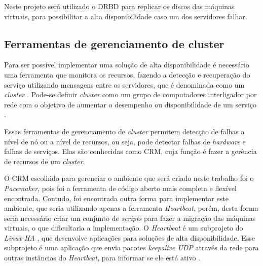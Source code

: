 Neste projeto será utilizado o \ac{DRBD} para replicar os discos das máquinas virtuais, para possibilitar a alta disponibilidade caso um 
dos servidores falhar.


\subsection{Ferramentas de gerenciamento de cluster}
\label{section:toolcluster}

Para ser possível implementar uma solução de alta disponibilidade é necessário uma ferramenta que monitora os recursos, fazendo a detecção e
recuperação do serviço utilizando mensagens entre os servidores, que é denominada como um \textit{cluster} \cite{perkov2011}. 
Pode-se definir \textit{cluster} como um grupo de computadores interligador por rede com o objetivo de aumentar o desempenho ou disponibilidade
de um serviço \cite{freitas2005}.

Essas ferramentas de gerenciamento de \textit{cluster} permitem detecção de falhas a nível de nó ou a nível de recursos, ou seja, pode detectar
falhas de \textit{hardware} e falhas de serviços. Elas são conhecidas como \ac{CRM}, cuja função é fazer a gerência de recursos de um 
\textit{cluster}.

O \ac{CRM} escolhido para gerenciar o ambiente que será criado neste trabalho foi o \textit{Pacemaker}, pois foi a ferramenta de código aberto
mais completa e flexível encontrada. Contudo, foi encontrada outra forma para implementar este ambiente, que seria utilizando apenas a 
ferramenta \textit{Heartbeat}, porém, desta forma seria necessário criar um conjunto de \textit{scripts} para fazer a migração das máquinas 
virtuais, o que dificultaria a implementação.
O \textit{Heartbeat} é um subprojeto do \textit{Linux-HA} \cite{linuxha}, que desenvolve aplicações para soluções de alta disponibilidade.
Esse subprojeto é uma aplicação que envia pacotes \textit{keepalive \ac{UDP}} através da rede para outras instâncias do \textit{Heartbeat}, para
informar se ele está ativo \cite{reis2009}.

